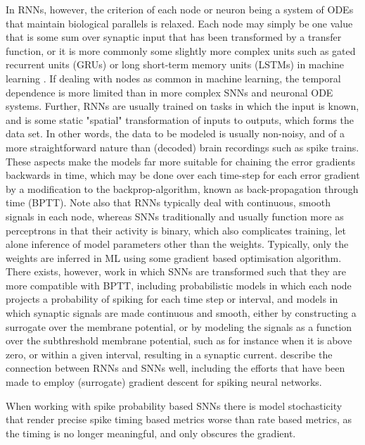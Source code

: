 \documentclass[mphil,deptreport,ai]{infthesis} %
\begin{document}
In RNNs, however, the criterion of each node or neuron being a system of ODEs that maintain biological parallels is relaxed. Each node may simply be one value that is some sum over synaptic input that has been transformed by a transfer function, or it is more commonly some slightly more complex units such as gated recurrent units (GRUs) \cite{Bengio2013b, Chung2015a} or long short-term memory units (LSTMs) in machine learning \cite{Hochreiter1997, Schmidhuber2014}.
If dealing with nodes as common in machine learning, the temporal dependence is more limited than in more complex SNNs and neuronal ODE systems.
Further, RNNs are usually trained on tasks in which the input is known, and is some static "spatial" transformation of inputs to outputs, which forms the data set.
In other words, the data to be modeled is usually non-noisy, and of a more straightforward nature than (decoded) brain recordings such as spike trains.
These aspects make the models far more suitable for chaining the error gradients backwards in time, which may be done over each time-step for each error gradient by a modification to the backprop-algorithm, known as back-propagation through time (BPTT).
Note also that RNNs typically deal with continuous, smooth signals in each node, whereas SNNs traditionally and usually function more as perceptrons in that their activity is binary, which also complicates training, let alone inference of model parameters other than the weights.
Typically, only the weights are inferred in ML using some gradient based optimisation algorithm.
There exists, however, work in which SNNs are transformed such that they are more compatible with BPTT, including probabilistic models in which each node projects a probability of spiking for each time step or interval, and models in which synaptic signals are made continuous and smooth, either by constructing a surrogate over the membrane potential, or by modeling the signals as a function over the subthreshold membrane potential, such as for instance when it is above zero, or within a given interval, resulting in a synaptic current.
\cite{Neftci2019} describe the connection between RNNs and SNNs well, including the efforts that have been made to employ (surrogate) gradient descent for spiking neural networks.

When working with spike probability based SNNs there is model stochasticity that render precise spike timing based metrics worse than rate based metrics, as the timing is no longer meaningful, and only obscures the gradient.
\end{document}
